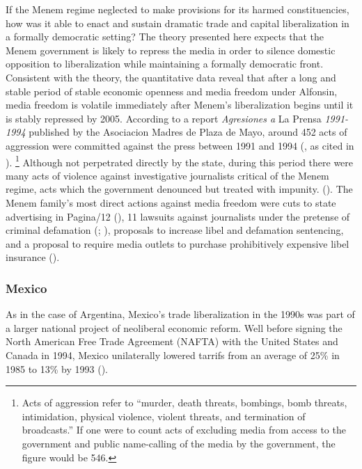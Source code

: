\documentclass[12pt]{report}
\begin{document}
If the Menem regime neglected to make provisions for its harmed constituencies,
how was it able to enact and sustain dramatic trade and capital liberalization
in a formally democratic setting? The theory presented here expects
that the Menem government is likely to repress the media in order
to silence domestic opposition to liberalization while maintaining
a formally democratic front. Consistent with the theory, the quantitative
data reveal that after a long and stable period of stable economic
openness and media freedom under Alfonsin, media freedom is volatile
immediately after Menem's liberalization begins until it is stably
repressed by 2005. According to a report \emph{Agresiones a }La Prensa\emph{
1991-1994} published by the Asociacion Madres de Plaza de Mayo, around
452 acts of aggression were committed against the press between 1991
and 1994 (\citealt{Delgado:1995tr}, as cited in \citealt[247]{Park:2002io}).
\footnote{Acts of aggression refer to ``murder, death threats, bombings, bomb
threats, intimidation, physical violence, violent threats, and termination
of broadcasts.'' If one were to count acts of excluding media from
access to the government and public name-calling of the media by the
government, the figure would be 546.%
} Although not perpetrated directly by the state, during this period
there were many acts of violence against investigative journalists
critical of the Menem regime, acts which the government denounced
but treated with impunity. (\citealt{Long:1993wb}). The Menem family's
most direct actions against media freedom were cuts to state advertising
in Pagina/12 (\citealt[27]{Waisbord:1994kq}), 11 lawsuits against
journalists under the pretense of criminal defamation (\citealt{McCullough:1991cs};
\citealt{Anonymous:TKNgfiRX}), proposals to increase libel and defamation
sentencing, and a proposal to require media outlets to purchase prohibitively
expensive libel insurance (\citealt{Sims:kgMPqAHd}).

\subsubsection{Mexico}

As in the case of Argentina, Mexico's trade liberalization in the
1990s was part of a larger national project of neoliberal economic
reform. Well before signing the North American Free Trade Agreement
(NAFTA) with the United States and Canada in 1994, Mexico unilaterally
lowered tarrifs from an average of 25\% in 1985 to 13\% by 1993 (\citealt{McDaniel:2003kw}).
\end{document}
